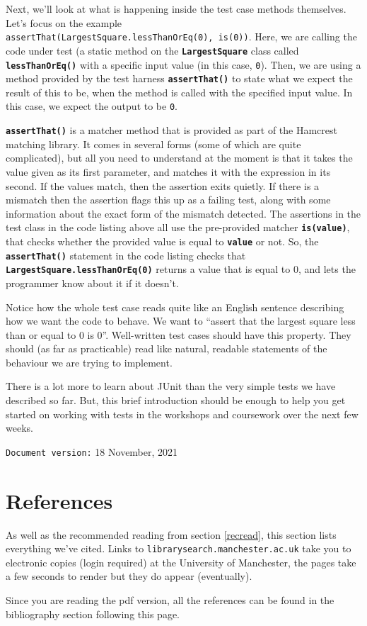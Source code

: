 \documentclass[
]{book}
\begin{document}
Next, we'll look at what is happening inside the test case methods themselves. Let's focus on the example \texttt{assertThat(LargestSquare.lessThanOrEq(0),\ is(0))}. Here, we are calling the code under test (a static method on the \textbf{\texttt{LargestSquare}} class called \textbf{\texttt{lessThanOrEq()}} with a specific input value (in this case, \texttt{0}). Then, we are using a method provided by the test harness \textbf{\texttt{assertThat()}} to state what we expect the result of this to be, when the method is called with the specified input value. In this case, we expect the output to be \texttt{0}.

\textbf{\texttt{assertThat()}} is a matcher method that is provided as part of the Hamcrest matching library. It comes in several forms (some of which are quite complicated), but all you need to understand at the moment is that it takes the value given as its first parameter, and matches it with the expression in its second. If the values match, then the assertion exits quietly. If there is a mismatch then the assertion flags this up as a failing test, along with some information about the exact form of the mismatch detected. The assertions in the test class in the code listing above all use the pre-provided matcher \textbf{\texttt{is(value)}}, that checks whether the provided value is equal to \textbf{\texttt{value}} or not. So, the \textbf{\texttt{assertThat()}} statement in the code listing checks that \textbf{\texttt{LargestSquare.lessThanOrEq(0)}} returns a value that is equal to 0, and lets the programmer know about it if it doesn't.

Notice how the whole test case reads quite like an English sentence describing how we want the code to behave. We want to ``assert that the largest square less than or equal to 0 is 0''. Well-written test cases should have this property. They should (as far as practicable) read like natural, readable statements of the behaviour we are trying to implement.

There is a lot more to learn about JUnit than the very simple tests we have described so far. But, this brief introduction should be enough to help you get started on working with tests in the workshops and coursework over the next few weeks.

\texttt{Document\ version:} 18 November, 2021

\hypertarget{reading}{%
\chapter{References}\label{reading}}

As well as the recommended reading from section \ref{recread}, this section lists everything we've cited. Links to \texttt{librarysearch.manchester.ac.uk} take you to electronic copies (login required) at the University of Manchester, the pages take a few seconds to render but they do appear (eventually).

Since you are reading the pdf version, all the references can be found in the bibliography section following this page.

  
\end{document}
